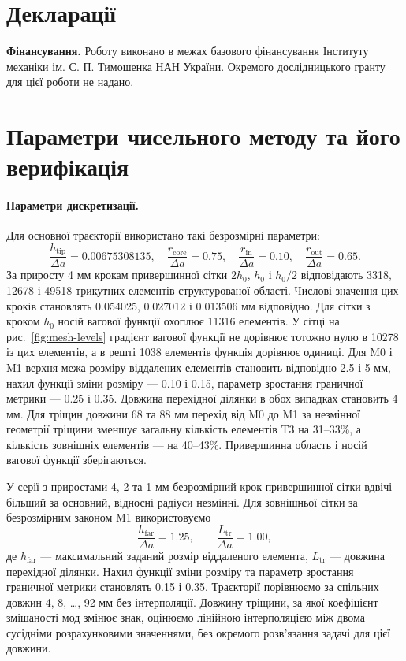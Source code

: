\documentclass[a4paper,12pt]{article}
\begin{document}
\FloatBarrier
\section*{Декларації}
\noindent\textbf{Фінансування.}
Роботу виконано в межах базового фінансування Інституту механіки ім. С. П. Тимошенка НАН
України. Окремого дослідницького гранту для цієї роботи не надано.
\appendix
\section{Параметри чисельного методу та його верифікація}
\label{app:numerical-details}
\paragraph{Параметри дискретизації.}
Для основної траєкторії використано такі безрозмірні параметри:
\[
 \frac{h_{\mathrm{tip}}}{\Delta a}=0.00675308135,\quad
 \frac{r_{\mathrm{core}}}{\Delta a}=0.75,\quad
 \frac{r_{\mathrm{in}}}{\Delta a}=0.10,\quad
 \frac{r_{\mathrm{out}}}{\Delta a}=0.65.
\]
За приросту 4 мм крокам привершинної сітки $2h_0$, $h_0$ і $h_0/2$ відповідають
3318, 12678 і 49518 трикутних елементів структурованої області. Числові значення
цих кроків становлять 0.054025, 0.027012 і 0.013506 мм відповідно.
Для сітки з кроком $h_0$ носій вагової функції охоплює 11316 елементів.
У сітці на рис.~\ref{fig:mesh-levels} градієнт вагової функції не дорівнює тотожно нулю
в 10278 із цих елементів, а в решті 1038 елементів функція дорівнює одиниці.
Для M0 і M1 верхня межа розміру віддалених елементів становить відповідно 2.5 і 5 мм,
нахил функції зміни розміру --- 0.10 і 0.15, параметр зростання граничної метрики --- 0.25 і 0.35.
Довжина перехідної ділянки в обох випадках становить 4 мм.
Для тріщин довжини 68 та 88 мм перехід від M0 до M1 за незмінної геометрії тріщини
зменшує загальну кількість
елементів T3 на 31--33\%, а кількість зовнішніх елементів --- на 40--43\%.
Привершинна область і носій вагової функції зберігаються.

У серії з приростами 4, 2 та 1 мм безрозмірний крок привершинної сітки вдвічі більший за основний,
відносні радіуси незмінні. Для зовнішньої сітки за безрозмірним законом M1 використовуємо
\[
 \frac{h_{\mathrm{far}}}{\Delta a}=1.25,\qquad
 \frac{L_{\mathrm{tr}}}{\Delta a}=1.00,
\]
де $h_{\mathrm{far}}$ --- максимальний заданий розмір віддаленого елемента, $L_{\mathrm{tr}}$ ---
довжина перехідної ділянки. Нахил функції зміни розміру та параметр зростання граничної метрики
становлять 0.15 і 0.35. Траєкторії порівнюємо за спільних довжин 4, 8, \ldots, 92 мм без інтерполяції.
Довжину тріщини, за якої коефіцієнт змішаності мод змінює знак, оцінюємо лінійною
інтерполяцією між двома сусідніми розрахунковими значеннями, без окремого розв’язання
задачі для цієї довжини.
\end{document}
